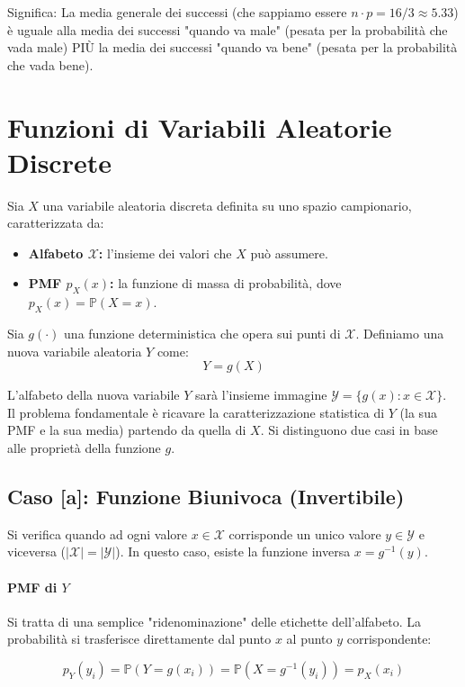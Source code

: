 Significa: La media generale dei successi (che sappiamo essere $n \cdot p = 16/3 \approx 5.33$) è uguale alla media dei successi "quando va male" (pesata per la probabilità che vada male) PIÙ la media dei successi "quando va bene" (pesata per la probabilità che vada bene).

\section{Funzioni di Variabili Aleatorie Discrete}

Sia $X$ una variabile aleatoria discreta definita su uno spazio campionario, caratterizzata da:
\begin{itemize}
    \item \textbf{Alfabeto $\mathcal{X}$:} l'insieme dei valori che $X$ può assumere.
    \item \textbf{PMF $p_X(x)$:} la funzione di massa di probabilità, dove $p_X(x) = \mathbb{P}(X = x)$.
\end{itemize}

Sia $g(\cdot)$ una funzione deterministica che opera sui punti di $\mathcal{X}$. Definiamo una nuova variabile aleatoria $Y$ come:
\[ Y = g(X) \]

L'alfabeto della nuova variabile $Y$ sarà l'insieme immagine $\mathcal{Y} = \{g(x) : x \in \mathcal{X}\}$.
\\Il problema fondamentale è ricavare la caratterizzazione statistica di $Y$ (la sua PMF e la sua media) partendo da quella di $X$. Si distinguono due casi in base alle proprietà della funzione $g$.

\subsection{Caso [a]: Funzione Biunivoca (Invertibile)}

Si verifica quando ad ogni valore $x \in \mathcal{X}$ corrisponde un unico valore $y \in \mathcal{Y}$ e viceversa ($|\mathcal{X}| = |\mathcal{Y}|$). In questo caso, esiste la funzione inversa $x = g^{-1}(y)$.

\paragraph{PMF di $Y$}
Si tratta di una semplice "ridenominazione" delle etichette dell'alfabeto. La probabilità si trasferisce direttamente dal punto $x$ al punto $y$ corrispondente:

\begin{equation}
\boxed{p_Y(y_i) = \mathbb{P}(Y = g(x_i)) = \mathbb{P}(X = g^{-1}(y_i)) = p_X(x_i)}
\end{equation}

